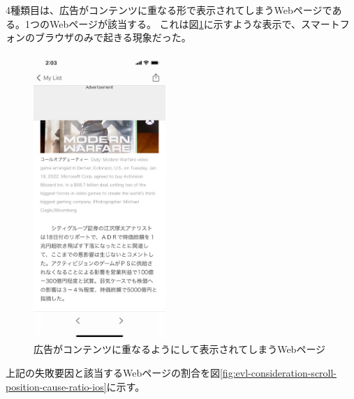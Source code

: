 
4種類目は、広告がコンテンツに重なる形で表示されてしまうWebページである。1つのWebページが該当する。
これは図\ref{fig:evl-consideration-scroll-position-example-ios-ad-overrap}に示すような表示で、スマートフォンのブラウザのみで起きる現象だった。

\begin{figure}[htbp]
  \caption{広告がコンテンツに重なるようにして表示されてしまうWebページ}
  \label{fig:evl-consideration-scroll-position-example-ios-ad-overrap}
  \begin{center}
    \includegraphics[bb=0 0 585 1266,width=5cm]{img/060_evaluation/consideration/scroll_position/example/ios-ad-overrap.pdf}
  \end{center}
\end{figure}

上記の失敗要因と該当するWebページの割合を図\ref{fig:evl-consideration-scroll-position-cause-ratio-ios}に示す。

